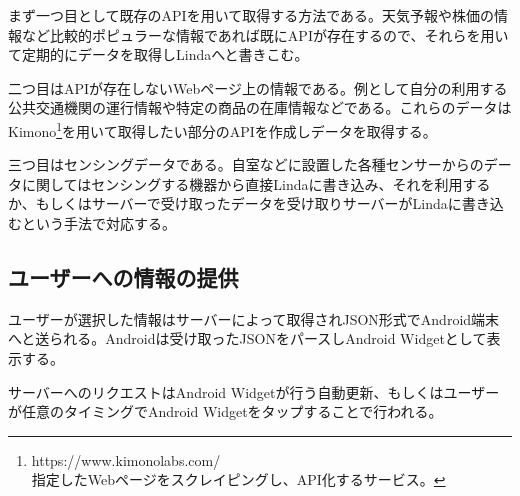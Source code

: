 まず一つ目として既存のAPIを用いて取得する方法である。天気予報や株価の情報など比較的ポピュラーな情報であれば既にAPIが存在するので、それらを用いて定期的にデータを取得しLindaへと書きこむ。

二つ目はAPIが存在しないWebページ上の情報である。例として自分の利用する公共交通機関の運行情報や特定の商品の在庫情報などである。これらのデータはKimono\footnote{https://www.kimonolabs.com/\\指定したWebページをスクレイピングし、API化するサービス。}を用いて取得したい部分のAPIを作成しデータを取得する。

三つ目はセンシングデータである。自室などに設置した各種センサーからのデータに関してはセンシングする機器から直接Lindaに書き込み、それを利用するか、もしくはサーバーで受け取ったデータを受け取りサーバーがLindaに書き込むという手法で対応する。

\subsection{ユーザーへの情報の提供}
ユーザーが選択した情報はサーバーによって取得されJSON形式でAndroid端末へと送られる。Androidは受け取ったJSONをパースしAndroid Widgetとして表示する。

サーバーへのリクエストはAndroid Widgetが行う自動更新、もしくはユーザーが任意のタイミングでAndroid Widgetをタップすることで行われる。

\nocite{*}
